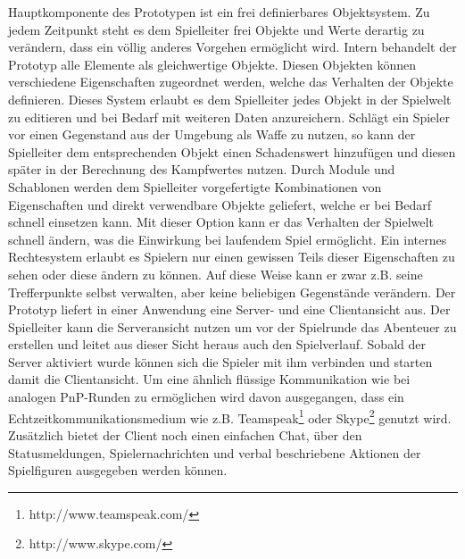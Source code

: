 Hauptkomponente des Prototypen ist ein frei definierbares Objektsystem. Zu jedem Zeitpunkt steht es dem Spielleiter frei Objekte und Werte derartig zu verändern, dass ein völlig anderes Vorgehen ermöglicht wird. Intern behandelt der Prototyp alle Elemente als gleichwertige Objekte. Diesen Objekten können verschiedene Eigenschaften zugeordnet werden, welche das Verhalten der Objekte definieren. Dieses System erlaubt es dem Spielleiter jedes Objekt in der Spielwelt zu editieren und bei Bedarf mit weiteren Daten anzureichern. Schlägt ein Spieler vor einen Gegenstand aus der Umgebung als Waffe zu nutzen, so kann der Spielleiter dem entsprechenden Objekt einen Schadenswert hinzufügen und diesen später in der Berechnung des Kampfwertes nutzen.\newline
Durch Module und Schablonen werden dem Spielleiter vorgefertigte Kombinationen von Eigenschaften und direkt verwendbare Objekte geliefert, welche er bei Bedarf schnell einsetzen kann. Mit dieser Option kann er das Verhalten der Spielwelt schnell ändern, was die Einwirkung bei laufendem Spiel ermöglicht.\newline
Ein internes Rechtesystem erlaubt es Spielern nur einen gewissen Teils dieser Eigenschaften zu sehen oder diese ändern zu können. Auf diese Weise kann er zwar z.B. seine Trefferpunkte selbst verwalten, aber keine beliebigen Gegenstände verändern.
Der Prototyp liefert in einer Anwendung eine Server- und eine Clientansicht aus. Der Spielleiter kann die Serveransicht nutzen um vor der Spielrunde das Abenteuer zu erstellen und leitet aus dieser Sicht heraus auch den Spielverlauf. Sobald der Server aktiviert wurde können sich die Spieler mit ihm verbinden und starten damit die Clientansicht. Um eine ähnlich flüssige Kommunikation wie bei analogen PnP-Runden zu ermöglichen wird davon ausgegangen, dass ein Echtzeitkommunikationsmedium wie z.B. Teamspeak\footnote{http://www.teamspeak.com/} oder Skype\footnote{http://www.skype.com/} genutzt wird. Zusätzlich bietet der Client noch einen einfachen Chat, über den Statusmeldungen, Spielernachrichten und verbal beschriebene Aktionen der Spielfiguren ausgegeben werden können. \newline
